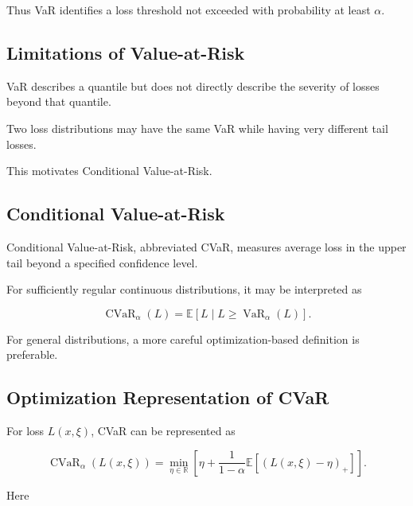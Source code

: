 Thus VaR identifies a loss threshold not exceeded with probability at
least \(\alpha\).

\subsection{Limitations of Value-at-Risk}
\label{subsec:limitations-var}

VaR describes a quantile but does not directly describe the severity of
losses beyond that quantile.

Two loss distributions may have the same VaR while having very different
tail losses.

This motivates Conditional Value-at-Risk.

\subsection{Conditional Value-at-Risk}
\label{subsec:conditional-value-at-risk}

Conditional Value-at-Risk, abbreviated CVaR, measures average loss in the
upper tail beyond a specified confidence level.

For sufficiently regular continuous distributions, it may be interpreted
as

\[
\boxed{
\operatorname{CVaR}_{\alpha}(L)
=
\mathbb{E}
[
L
\mid
L\geq
\operatorname{VaR}_{\alpha}(L)
].
}
\]

For general distributions, a more careful optimization-based definition
is preferable.

\subsection{Optimization Representation of CVaR}
\label{subsec:cvar-optimization-representation}

For loss \(L(x,\xi)\), CVaR can be represented as

\[
\boxed{
\operatorname{CVaR}_{\alpha}
(
L(x,\xi)
)
=
\min_{\eta\in\mathbb{R}}
\left[
\eta
+
\frac{
1
}{
1-\alpha
}
\mathbb{E}
\left[
(
L(x,\xi)-\eta
)_+
\right]
\right].
}
\]

Here

